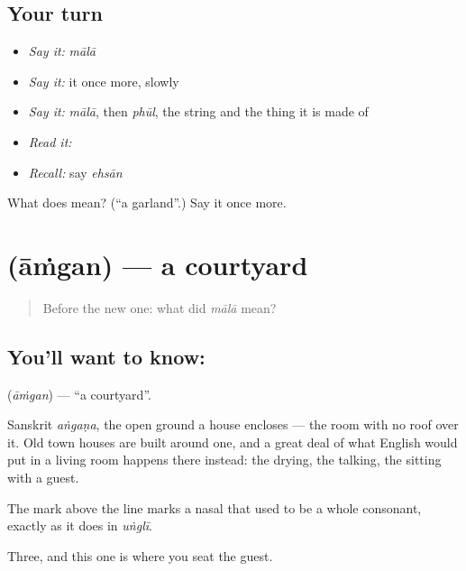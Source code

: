 \subsection*{Your turn}
\begin{itemize}
\raggedright
  \item \emph{Say it:} \emph{mālā}
  \item \emph{Say it:} it once more, slowly
  \item \emph{Say it:} \emph{mālā}, then \emph{phūl}, the string and the thing it is made of
  \item \emph{Read it:} \textbf{}
  \item \emph{Recall:} say \emph{ehsān}
\end{itemize}

\begin{tcolorbox}[breakable,colback=teal!4,colframe=teal!35!black,title={Before you move on}]
What does  mean? (\textquotedblleft{}a garland\textquotedblright{}.) Say it once more.
\end{tcolorbox}
\section[\texorpdfstring{\hi{आँगन} (āṁgan)}{आँगन (āṁgan)}]{ (āṁgan) — a courtyard}

\label{lesson:HI-C51-courtyard}



\begin{quote}
Before the new one: what did \emph{mālā} mean?
\end{quote}

\subsection*{You'll want to know: }
\textbf{} (\emph{āṁgan}) — \textquotedblleft{}a courtyard\textquotedblright{}.

Sanskrit \emph{aṅgaṇa}, the open ground a house encloses — the room with no roof over it. Old town houses are built around one, and a great deal of what English would put in a living room happens there instead: the drying, the talking, the sitting with a guest.

The mark above the line marks a nasal that used to be a whole consonant, exactly as it does in \emph{uṅglī}.

\begin{grammarlens}[title={What you've built}]
Three, and this one is where you seat the guest.
\end{grammarlens}

